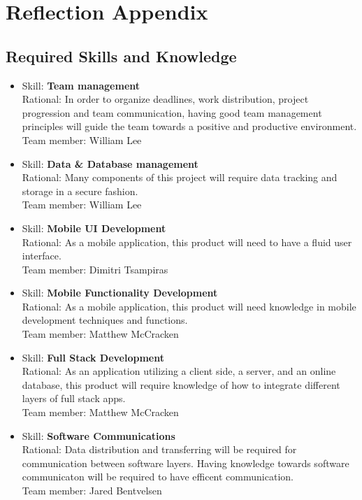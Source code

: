 \documentclass[12pt]{article}
\begin{document}
	\section{Reflection Appendix}

	\subsection{Required Skills and Knowledge}
	\begin{itemize}
			
		\item Skill: \textbf{Team management}
		\\ Rational: In order to organize deadlines, work distribution, project progression and team communication, having good team management principles will guide the team towards a positive and productive environment.
		\\ Team member: William Lee
		
		\item Skill: \textbf{Data \& Database management}
		\\ Rational: Many components of this project will require data tracking and storage in a secure fashion.
		\\ Team member: William Lee
		
		\item Skill: \textbf{Mobile UI Development}
		\\ Rational: As a mobile application, this product will need to have a fluid user interface.
		\\ Team member: Dimitri Tsampiras
		
		\item Skill: \textbf{Mobile Functionality Development}
		\\ Rational: As a mobile application, this product will need knowledge in mobile development techniques and functions.
		\\ Team member: Matthew McCracken

		\item Skill: \textbf{Full Stack Development}
		\\ Rational: As an application utilizing a client side, a server, and an online database, this product will require knowledge of how to integrate different layers of full stack apps.
		\\ Team member: Matthew McCracken
		
		\item Skill: \textbf{Software Communications}
		\\ Rational: Data distribution and transferring will be required for communication between software layers. Having knowledge towards software communicaton will be required to have efficent communication.
		\\ Team member: Jared Bentvelsen
		

\end{itemize}
\end{document}
